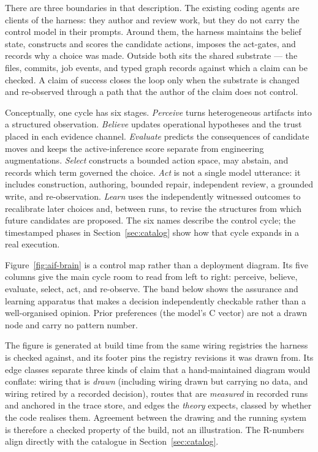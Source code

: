 
There are three boundaries in that description.  The existing coding agents are
clients of the harness: they author and review work, but they do not carry the
control model in their prompts.  Around them, the harness maintains the belief
state, constructs and scores the candidate actions, imposes the act-gates, and
records why a choice was made.  Outside both sits the shared substrate --- the
files, commits, job events, and typed graph records against which a claim can be
checked.  A claim of success closes the loop only when the substrate is changed
and re-observed through a path that the author of the claim does not control.

Conceptually, one cycle has six stages.  \emph{Perceive} turns heterogeneous
artifacts into a structured observation.  \emph{Believe} updates operational
hypotheses and the trust placed in each evidence channel.  \emph{Evaluate}
predicts the consequences of candidate moves and keeps the active-inference
score separate from engineering augmentations.  \emph{Select} constructs a
bounded action space, may abstain, and records which term governed the choice.
\emph{Act} is not a single model utterance: it includes construction, authoring,
bounded repair, independent review, a grounded write, and re-observation.
\emph{Learn} uses the independently witnessed outcomes to recalibrate later
choices and, between runs, to revise the structures from which future
candidates are proposed.  The six names describe the control cycle; the
timestamped phases in Section~\ref{sec:catalog} show how that cycle expands in a
real execution.

Figure~\ref{fig:aif-brain} is a control map rather than a deployment diagram.
Its five columns give the main cycle room to read from left to right: perceive,
believe, evaluate, select, act, and re-observe.  The band below shows the
assurance and learning apparatus that makes a decision independently checkable
rather than a well-organised opinion.  Prior preferences (the model's C
vector) are not a drawn node and carry no pattern number.

The figure is generated at build time from the same wiring registries the
harness is checked against, and its footer pins the registry revisions it was
drawn from.  Its edge classes separate three kinds of claim that a
hand-maintained diagram would conflate: wiring that is \emph{drawn} (including
wiring drawn but carrying no data, and wiring retired by a recorded decision),
routes that are \emph{measured} in recorded runs and anchored in the trace
store, and edges the \emph{theory} expects, classed by whether the code
realises them.  Agreement between the drawing and the running system is
therefore a checked property of the build, not an illustration.  The
R-numbers align directly with the catalogue in Section~\ref{sec:catalog}.

